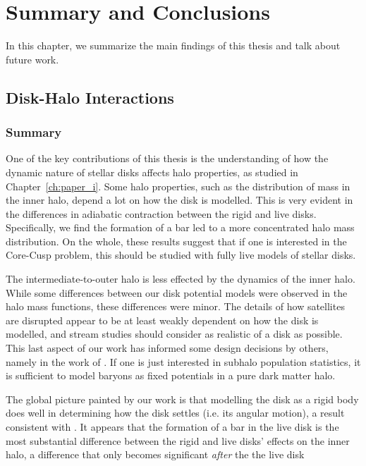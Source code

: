 \chapter{Summary and Conclusions}\label{ch:conclusion}
\newpage


In this chapter, we summarize the  main findings of this thesis and talk about future work.


\section{Disk-Halo Interactions}


\subsection{Summary}

One of the key contributions of this thesis is the understanding of how the dynamic nature of stellar disks affects halo properties, as studied in Chapter~\ref{ch:paper_i}. Some halo properties, such as the distribution of mass in the inner halo, depend a lot on how the disk is modelled. This is very evident in the differences in adiabatic contraction between the rigid and live disks. Specifically, we find the formation of a bar led to a more concentrated halo mass distribution. On the whole, these results suggest that if one is interested in the Core-Cusp problem, this should be studied with fully live models of stellar disks.

The intermediate-to-outer halo is less effected by the dynamics of the inner halo. While some differences between our disk potential models were observed in the halo mass functions, these differences were minor. The details of how satellites are disrupted appear to be at least weakly dependent on how the disk is modelled, and stream studies should consider as realistic of a disk as possible. This last aspect of our work has informed some design decisions by others, namely in the work of \citet{read_2019}. If one is just interested in subhalo population statistics, it is sufficient to model baryons as fixed potentials in a pure dark matter halo.

The global picture painted by our work is that modelling the disk as a rigid body does well in determining how the disk settles (i.e. its angular motion), a result consistent with \citet{DubinskiKuijkenRigidDisks}. It appears that the formation of a bar in the live disk is the most substantial difference between the rigid and live disks' effects on the inner halo, a difference that only becomes significant \textit{after} the the live disk



